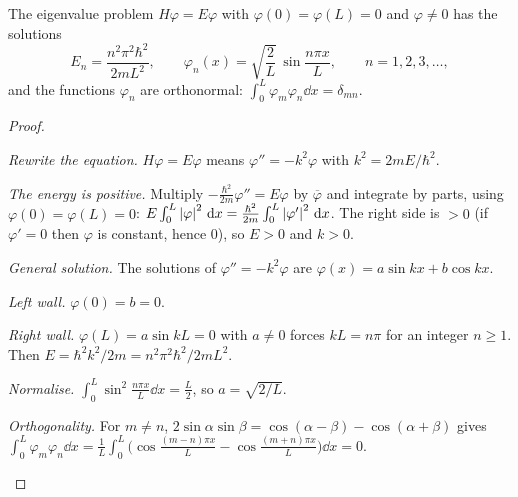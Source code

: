 \begin{theorem}\label{thm:box}
  The eigenvalue problem $H\varphi=E\varphi$ with $\varphi(0)=\varphi(L)=0$ and $\varphi\neq0$ has the solutions
  \[
    E_n=\frac{n^2\pi^2\hbar^2}{2mL^2},\qquad\varphi_n(x)=\sqrt{\frac2L}\,\sin\frac{n\pi x}{L},\qquad n=1,2,3,\dots,
  \]
  and the functions $\varphi_n$ are orthonormal: $\int_0^L\varphi_m\varphi_n\dd x=\delta_{mn}$.
\end{theorem}
\begin{proof}
  \begin{steps}
    \item \emph{Rewrite the equation.} $H\varphi=E\varphi$ means $\varphi''=-k^2\varphi$ with $k^2=2mE/\hbar^2$.
    \item \emph{The energy is positive.} Multiply $-\frac{\hbar^2}{2m}\varphi''=E\varphi$ by $\overline\varphi$ and integrate by parts, using $\varphi(0)=\varphi(L)=0$: $E\int_0^L\left|\varphi\right|^2\,\mathrm{d} x=\frac{\hbar^2}{2m}\int_0^L\left|\varphi'\right|^2\,\mathrm{d} x$. The right side is $>0$ (if $\varphi'=0$ then $\varphi$ is constant, hence $0$), so $E>0$ and $k>0$.
    \item \emph{General solution.} The solutions of $\varphi''=-k^2\varphi$ are $\varphi(x)=a\sin kx+b\cos kx$.
    \item \emph{Left wall.} $\varphi(0)=b=0$.
    \item \emph{Right wall.} $\varphi(L)=a\sin kL=0$ with $a\neq0$ forces $kL=n\pi$ for an integer $n\ge1$. Then $E=\hbar^2k^2/2m=n^2\pi^2\hbar^2/2mL^2$.
    \item \emph{Normalise.} $\int_0^L\sin^2\frac{n\pi x}{L}\dd x=\frac L2$, so $a=\sqrt{2/L}$.
    \item \emph{Orthogonality.} For $m\neq n$, $2\sin\alpha\sin\beta=\cos(\alpha-\beta)-\cos(\alpha+\beta)$ gives $\int_0^L\varphi_m\varphi_n\dd x=\frac1L\int_0^L\bigl(\cos\frac{(m-n)\pi x}L-\cos\frac{(m+n)\pi x}L\bigr)\dd x=0$. \qedhere
  \end{steps}
\end{proof}

